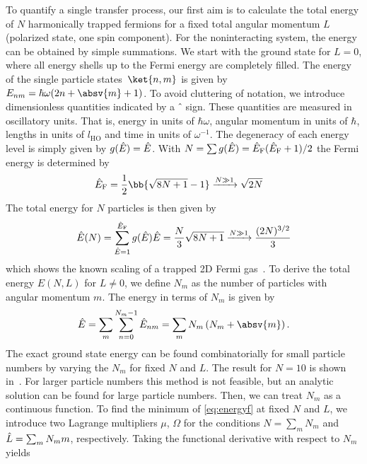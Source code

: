 To quantify a single transfer process, our first aim is to calculate the total energy of $N$ harmonically trapped fermions for a fixed total angular momentum $L$ (polarized state, one spin component). For the noninteracting system, the energy can be obtained by simple summations. We start with the ground state for $L=0$, where all energy shells up to the Fermi energy are completely filled. The energy of the single particle states~$\ket{n,m}$ is given by $E_{nm}=\hbar\omega(2n+\absv{m}+1)$. To avoid cluttering of notation, we introduce dimensionless quantities indicated by a ${\hat \ }$ sign. These quantities are measured in oscillatory units. That is, energy in units of $\hbar\omega$, angular momentum in units of $\hbar$, lengths in units of $l_\text{HO}$ and time in units of $\omega^{-1}$. The degeneracy of each energy level is simply given by $g({\hat E}) = {\hat E}$.
With $N=\sum g({\hat E}) = {\hat E}_\text{F}({\hat E}_\text{F}+1)/2$ the Fermi energy is determined by
\begin{align*}
\dlEf &= \frac{1}{2}\bb{\sqrt{8N+1}-1} \xrightarrow{N\gg 1} \sqrt{2N}
\end{align*}
The total energy for $N$ particles is then given by
\begin{align} \label{eq:energyzero}
{\hat E}(N) = \sum_{{\hat E}=1}^{{\hat E}_\text{F}} g({\hat E}) {\hat E} = \frac{N}{3} \sqrt{8N+1} \xrightarrow{N\gg 1} \frac{(2N)^{3/2}}{3}
\end{align}
which shows the known scaling of a trapped 2D Fermi gas~\cite{Yoshimoto2003}.
To derive the total energy $E(N,L)$ for $L\ne 0$, we define $N_m$ as the number of particles with angular momentum $m$. The energy in terms of $N_m$ is given by
\begin{align} \label{eq:energyf}
\dl{E} = \sum_m \sum_{n=0}^{N_m-1} \dl{E}_{nm} = \sum_m N_m\left(N_m + \absv{m} \right).
\end{align}
The exact ground state energy can be found combinatorially for small particle numbers by varying the $N_m$ for fixed $N$ and $L$. The result for $N=10$ is shown in~. For larger particle numbers this method is not feasible, but an analytic solution can be found for large particle numbers. Then, we can treat $N_{m}$ as a continuous function. To find the minimum of \eqref{eq:energyf} at fixed $N$ and $L$, we introduce two Lagrange multipliers $\mu$, $\Omega$ for the conditions $N = \sum_m N_m$ and ${\hat L} = \sum_m N_m m$, respectively. Taking the functional derivative with respect to $N_m$ yields
